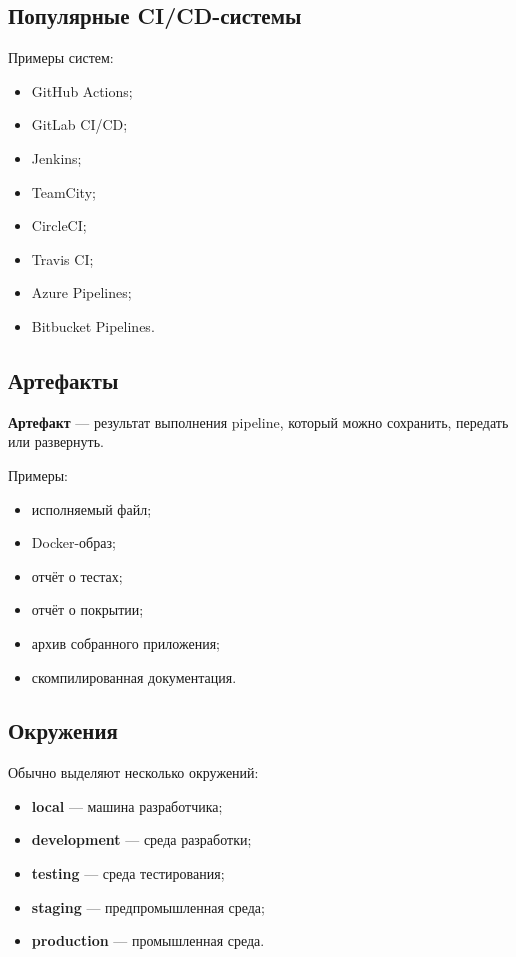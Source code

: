 \documentclass[12pt,a4paper]{article}
\begin{document}
\subsection{Популярные CI/CD-системы}

Примеры систем:

\begin{itemize}
    \item GitHub Actions;
    \item GitLab CI/CD;
    \item Jenkins;
    \item TeamCity;
    \item CircleCI;
    \item Travis CI;
    \item Azure Pipelines;
    \item Bitbucket Pipelines.
\end{itemize}

\subsection{Артефакты}

\textbf{Артефакт} --- результат выполнения pipeline, который можно сохранить, передать или развернуть.

Примеры:

\begin{itemize}
    \item исполняемый файл;
    \item Docker-образ;
    \item отчёт о тестах;
    \item отчёт о покрытии;
    \item архив собранного приложения;
    \item скомпилированная документация.
\end{itemize}

\subsection{Окружения}

Обычно выделяют несколько окружений:

\begin{itemize}
    \item \textbf{local} --- машина разработчика;
    \item \textbf{development} --- среда разработки;
    \item \textbf{testing} --- среда тестирования;
    \item \textbf{staging} --- предпромышленная среда;
    \item \textbf{production} --- промышленная среда.
\end{itemize}
\end{document}
